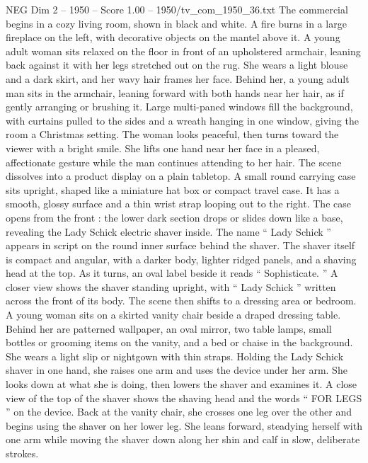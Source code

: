 \begin{textsample}{NEG Dim 2 – 1950 – Score 1.00 – 1950/tv\_com\_1950\_36.txt}  \label{ex:f2_neg_006}
The commercial begins in a cozy living room, shown in black and white.
A fire burns in a large fireplace on the left, with decorative objects on the mantel above it.
A young adult woman sits relaxed on the floor in front of an upholstered armchair, leaning back against it with her legs stretched out on the rug.
She wears a light blouse and a dark skirt, and her wavy hair frames her face.
Behind her, a young adult man sits in the armchair, leaning forward with both hands near her hair, as if gently arranging or brushing it.
Large multi-paned windows fill the background, with curtains pulled to the sides and a wreath hanging in one window, giving the room a Christmas setting.
The woman looks peaceful, then turns toward the viewer with a bright smile.
She lifts one hand near her face in a pleased, affectionate gesture while the man continues attending to her hair.
The scene dissolves into a product display on a plain tabletop.
A small round carrying case sits upright, shaped like a miniature hat box or compact travel case.
It has a smooth, glossy surface and a thin wrist strap looping out to the right.
The case opens from the front : the lower dark section drops or slides down like a base, revealing the Lady Schick electric shaver inside.
The name “ Lady Schick ” appears in script on the round inner surface behind the shaver.
The shaver itself is compact and angular, with a darker body, lighter ridged panels, and a shaving head at the top.
As it turns, an oval label beside it reads “ Sophisticate. ” A closer view shows the shaver standing upright, with “ Lady Schick ” written across the front of its body.
The scene then shifts to a dressing area or bedroom.
A young woman sits on a skirted vanity chair beside a draped dressing table.
Behind her are patterned wallpaper, an oval mirror, two table lamps, small bottles or grooming items on the vanity, and a bed or chaise in the background.
She wears a light slip or nightgown with thin straps.
Holding the Lady Schick shaver in one hand, she raises one arm and uses the device under her arm.
She looks down at what she is doing, then lowers the shaver and examines it.
A close view of the top of the shaver shows the shaving head and the words “ FOR LEGS ” on the device.
Back at the vanity chair, she crosses one leg over the other and begins using the shaver on her lower leg.
She leans forward, steadying herself with one arm while moving the shaver down along her shin and calf in slow, deliberate strokes.

\end{textsample}
